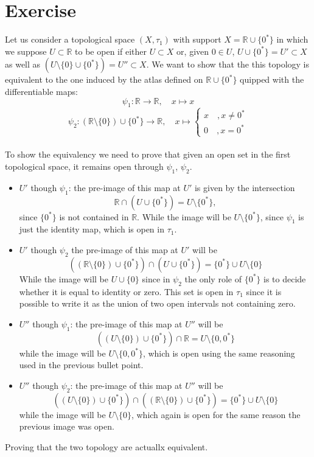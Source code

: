 \documentclass{article}
\begin{document}
\section{Exercise}
    Let us consider a topological space $(X, \tau_1)$ with support $X = \mathbb{R} \cup \{ 0^* \}$ in which we suppose $U \subset \mathbb{R}$ to be open if either $U \subset X$ or, given $0 \in U$, $U \cup \{ 0^* \} = U' \subset X$ as well as $(U \setminus \{0\} \cup \{ 0^* \}) = U'' \subset X$. We want to show that the this topology is equivalent to the one induced by the atlas defined on $\mathbb{R} \cup \{ 0^* \}$ quipped with the differentiable maps:\\
    \[
        \psi_1 : \mathbb{R} \to \mathbb{R}, \quad x \mapsto x
    \]
    \[
        \psi_2 : (\mathbb{R} \setminus \{ 0 \}) \cup \{ 0^* \} \to \mathbb{R}, \quad x \mapsto
        \begin{cases}
            x\quad , x \neq 0^*\\
            0\quad , x = 0^* 
        \end{cases}
    \]\\
    To show the equivalency we need to prove that given an open set in the first topological space, it remains open through $\psi_1$, $\psi_2$.
    \begin{itemize}[label={--}]
        \item $U'$ though $\psi_1$: 
        the pre-image of this map at $U'$ is given by the intersection
        \[
            \mathbb{R} \cap( U \cup \{ 0^* \}) = U \setminus \{ 0^* \},
        \]
        since $ \{ 0^* \}$ is not contained in $\mathbb{R}$. While the image will be $ U \setminus \{ 0^* \}$, since $\psi_1$ is just the identity map, which is open in $\tau_1$.
        \item $U'$ though $\psi_2$
        the pre-image of this map at $U'$ will be
        \[
           ( (\mathbb{R} \setminus \{0\}) \cup  \{0^*\}) \cap ( U \cup \{ 0^* \}) = \{0^*\} \cup U \setminus \{ 0 \}
        \]
        While the image will be $ U \cup \{0\}$ since in $\psi_2$ the only role of $\{0^*\}$ is to decide whether it is equal to identity or zero. This set is open in $\tau_1$ since it is possible to write it as the union of two open intervals not containing zero.
         \item $U''$ though $\psi_1$:
          the pre-image of this map at $U''$ will be
          \[
            ((U \setminus \{ 0 \}) \cup \{ 0^* \} ) \cap \mathbb{R} = U\setminus \{0, 0^*\}
          \]
          while the image will be $U\setminus \{ 0,0^* \}$, which is open using the same reasoning used in the previous bullet point. 
          \item $U''$ though $\psi_2$: 
           the pre-image of this map at $U''$ will be
          \[
            ((U \setminus \{ 0 \}) \cup \{ 0^* \} ) \cap   ( (\mathbb{R} \setminus \{0\}) \cup  \{0^*\}) = \{ 0^* \}\cup U \setminus \{0\}
          \]
          while the image will be $U\setminus \{ 0 \}$, which again is open for the same reason the previous image was open. 
    \end{itemize}
    Proving that the two topology are actuallx equivalent.
\end{document}
